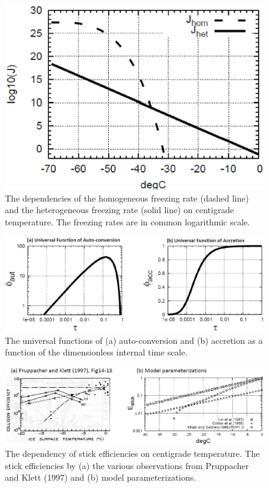 \begin{figure}[]
\begin{center}
\includegraphics[scale=0.5]{./figure/homo_frz_rate.eps}
\end{center}
\caption{The dependencies of the homogeneous freezing rate (dashed line) and the heterogeneous freezing rate (solid line) on centigrade temperature. The freezing rates are in common logarithmic scale.}
\label{figsn2-20}
\end{figure}

\begin{figure}[]
\begin{center}
\includegraphics[scale=0.25]{./figure/univ_function.eps}
\end{center}
\caption{The universal functions of (a) auto-conversion and (b) accretion as a function of the dimensionless internal time scale.}
\label{figsn2-21}
\end{figure}

\begin{figure}[]
\begin{center}
\includegraphics[scale=0.25]{./figure/stic_effic.eps}
\end{center}
\caption{The dependency of stick efficiencies on centigrade temperature. The stick efficiencies by (a) the various observations from Pruppacher and Klett (1997) and (b) model parameterizations.}
\label{figsn2-22}
\end{figure}

